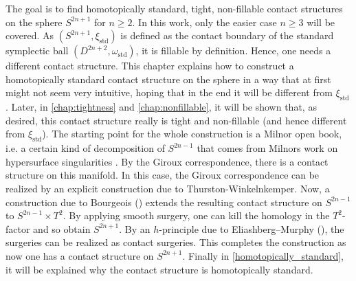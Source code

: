 The goal is to find homotopically standard, tight, non-fillable contact structures on the sphere $S^{2n+1}$ for $n \geq 2$.
In this work, only the easier case $n \geq 3$ will be covered.
As $(S^{2n+1}, \xi_\mathrm{std})$ is defined as the contact boundary of the standard symplectic ball $(D^{2n+2}, \omega_\mathrm{std})$,
it is fillable by definition.
Hence, one needs a different contact structure.
This chapter explains how to construct a homotopically standard contact structure on the sphere in a way that at first might not seem very intuitive,
hoping that in the end it will be different from $\xi_\mathrm{std}$.
Later, in \cref{chap:tightness} and \cref{chap:nonfillable}, it will be shown that, as desired, this contact structure really is tight and non-fillable 
(and hence different from $\xi_\mathrm{std}$).
The starting point for the whole construction is a Milnor open book, i.e. a certain kind of decomposition of $S^{2n-1}$ that comes from
Milnors work on hypersurface singularities \cite{Milnor69}.
By the Giroux correspondence, there is a contact structure on this manifold.
In this case, the Giroux correspondence can be realized by an explicit construction due to Thurston-Winkelnkemper.
Now, a construction due to Bourgeois (\cite{Bourgeois02}) extends the resulting contact structure on $S^{2n-1}$ to $S^{2n-1}\times T^2$.
By applying smooth surgery, one can kill the homology in the $T^2$-factor and so obtain $S^{2n+1}$.
By an $h$-principle due to Eliashberg--Murphy (\cite[section 12.4]{EM02}), the surgeries can be realized as contact surgeries.
This completes the construction as now one has a contact structure on $S^{2n+1}$.
Finally in \cref{homotopically_standard}, it will be explained why the contact structure is homotopically standard.